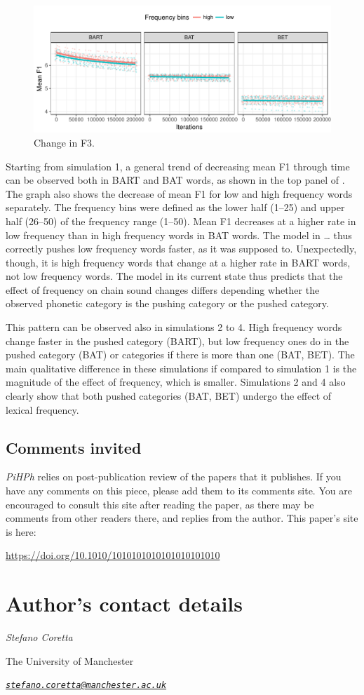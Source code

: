 \documentclass[article, a4paper, 12pt, ]{memoir}
\newcommand\thisdoi{10.1010/1010101010101010101010}
\newcommand\thisdoilink{https://doi.org/\thisdoi}
\newcommand\commentsinvited{
\begin{tcdoublebox}

\section*{\textcolor{pihphgreen}{Comments invited}}

\textit{PiHPh} relies on post-publication review of the papers that it publishes. If you have any comments on this piece, please add them to its comments site. You are encouraged to consult this site after reading the paper, as there may be comments from other readers there, and replies from the author. This paper's site is here:

\noindent \url{\thisdoilink}

\end{tcdoublebox}
}
\begin{document}
\begin{figure}
\includegraphics{../../figures/plot_4.pdf}
\caption{Change in F3.}
\label{f:results}
\end{figure}

Starting from simulation 1, a general trend of decreasing mean F1
through time can be observed both in BART and BAT words, as shown in the
top panel of . The graph also shows the decrease of mean
F1 for low and high frequency words separately. The frequency bins were
defined as the lower half (1--25) and upper half (26--50) of the
frequency range (1--50). Mean F1 decreases at a higher rate in low
frequency than in high frequency words in BAT words. The model in
\ldots{} thus correctly pushes low frequency words faster, as it was
supposed to. Unexpectedly, though, it is high frequency words that
change at a higher rate in BART words, not low frequency words. The
model in its current state thus predicts that the effect of frequency on
chain sound changes differs depending whether the observed phonetic
category is the pushing category or the pushed category.

This pattern can be observed also in simulations 2 to 4. High frequency
words change faster in the pushed category (BART), but low frequency
ones do in the pushed category (BAT) or categories if there is more than
one (BAT, BET). The main qualitative difference in these simulations if
compared to simulation 1 is the magnitude of the effect of frequency,
which is smaller. Simulations 2 and 4 also clearly show that both pushed
categories (BAT, BET) undergo the effect of lexical frequency.

\commentsinvited %



\section*{Author's contact details}
\label{sec:auth-cont-deta}

\noindent \textit{Stefano Coretta}

\noindent The University of Manchester

\vspace*{5pt}
\noindent \textit{\href{mailto:stefano.coretta@manchester.ac.uk}{\nolinkurl{stefano.coretta@manchester.ac.uk}}}


\renewcommand\bibsection{\section*{References}}

\end{document}
